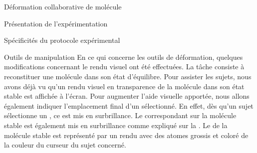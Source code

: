 \documentclass[myfrancais]{mythesis}
\begin{document}
\begin{mychapter}{Déformation collaborative de molécule}
\begin{mysection}{Présentation de l'expérimentation}
\begin{mysubsection}{Spécificités du protocole expérimental}
\begin{mysubsubsection}{Outils de manipulation}
					En ce qui concerne les outils de déformation, quelques modifications concernant le rendu visuel ont été effectuées.
					La tâche consiste à reconstituer une molécule dans son état d'équilibre.
					Pour assister les sujets, nous avons déjà vu qu'un rendu visuel en transparence de la molécule dans son état stable est affichée à l'écran.
					Pour augmenter l'aide visuelle apportée, nous allons également indiquer l'emplacement final d'un  sélectionné.
					En effet, dès qu'un sujet sélectionne un \myglos{glo-Residu}, ce  est mis en surbrillance.
					Le  correspondant sur la molécule stable est également mis en surbrillance comme expliqué sur la .
					Le  de la molécule stable est représenté par un rendu \myCPK avec des atomes grossis et coloré de la couleur du curseur du sujet concerné.


\end{mysubsubsection}
\end{mysubsection}
\end{mysection}
\end{mychapter}
\end{document}

